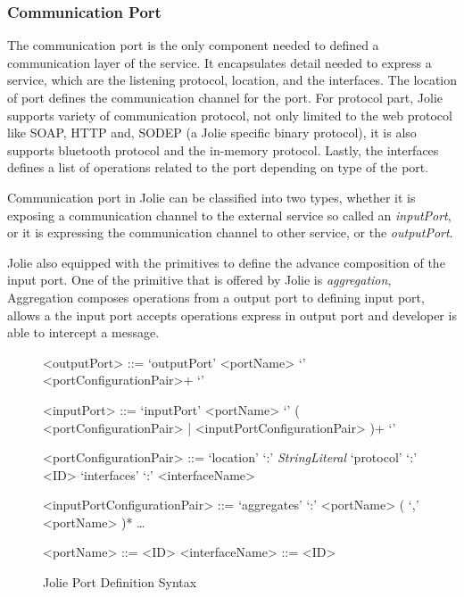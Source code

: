 \subsubsection{Communication Port}

The communication port is the only component needed to defined a communication layer of the service.
It encapsulates detail needed to express a service, which are the listening protocol, location, and the interfaces. The location of port defines the communication channel for the port. For protocol part, Jolie supports variety of communication protocol, not only limited to the web protocol like SOAP, HTTP and, SODEP (a Jolie specific binary protocol), it is also supports bluetooth protocol and the in-memory protocol. Lastly, the interfaces defines a list of operations related to the port depending on type of the port.

Communication port in Jolie can be classified into two types, whether it is exposing a communication channel to the external service so called an \textit{inputPort}, or it is expressing the communication channel to other service, or the \textit{outputPort}.

Jolie also equipped with the primitives to define the advance composition of the input port. One of the primitive that is offered by Jolie is \textit{aggregation}, Aggregation composes operations from a output port to defining input port, allows a the input port accepts operations express in output port and developer is able to intercept a message.

\begin{figure}[ht]
    \begin{framed}
        \begin{grammar}
            <outputPort>
            ::= `outputPort' <portName> `{' <portConfigurationPair>+ `}'

            <inputPort>
            ::= `inputPort' <portName> `{' ( <portConfigurationPair> | <inputPortConfigurationPair> )+ `}'

            <portConfigurationPair>
            ::= `location' `:' \textit{StringLiteral}
            \alt `protocol' `:' <ID>
            \alt `interfaces' `:' <interfaceName>

            <inputPortConfigurationPair>
            ::=  `aggregates' `:' <portName> ( `,' <portName> )* \alt \dots

            <portName> ::= <ID>
            <interfaceName> ::= <ID>

        \end{grammar}
    \end{framed}
    \caption{Jolie Port Definition Syntax}
\end{figure}

